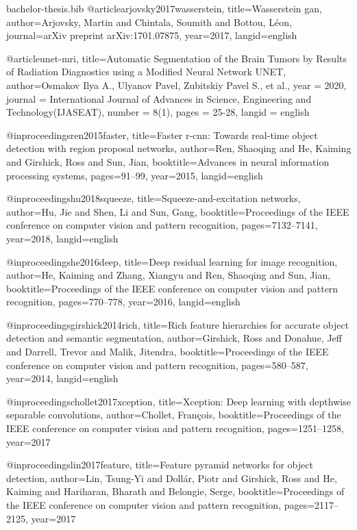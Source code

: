 \begin{filecontents}{bachelor-thesis.bib}
@article{arjovsky2017wasserstein,
  title={Wasserstein gan},
  author={Arjovsky, Martin and Chintala, Soumith and Bottou, L{\'e}on},
  journal={arXiv preprint arXiv:1701.07875},
  year={2017},
  langid={english}
}

@article{unet-mri,
  title={Automatic Segmentation of the Brain Tumors by Results of Radiation Diagnostics using a Modified Neural Network UNET},
  author={Osmakov Ilya A., Ulyanov Pavel, Zubitskiy Pavel S., et al.},
  year      = {2020},
  journal   = {International Journal of Advances in Science, Engineering and Technology(IJASEAT)},
  number    = {8(1)},
  pages     = {25-28},
  langid    = {english}
}



@inproceedings{ren2015faster,
  title={Faster r-cnn: Towards real-time object detection with region proposal networks},
  author={Ren, Shaoqing and He, Kaiming and Girshick, Ross and Sun, Jian},
  booktitle={Advances in neural information processing systems},
  pages={91--99},
  year={2015},
  langid={english}
}

@inproceedings{hu2018squeeze,
  title={Squeeze-and-excitation networks},
  author={Hu, Jie and Shen, Li and Sun, Gang},
  booktitle={Proceedings of the IEEE conference on computer vision and pattern recognition},
  pages={7132--7141},
  year={2018},
  langid={english}
}

@inproceedings{he2016deep,
  title={Deep residual learning for image recognition},
  author={He, Kaiming and Zhang, Xiangyu and Ren, Shaoqing and Sun, Jian},
  booktitle={Proceedings of the IEEE conference on computer vision and pattern recognition},
  pages={770--778},
  year={2016},
  langid={english}
}

@inproceedings{girshick2014rich,
  title={Rich feature hierarchies for accurate object detection and semantic segmentation},
  author={Girshick, Ross and Donahue, Jeff and Darrell, Trevor and Malik, Jitendra},
  booktitle={Proceedings of the IEEE conference on computer vision and pattern recognition},
  pages={580--587},
  year={2014},
  langid={english}
}

@inproceedings{chollet2017xception,
  title={Xception: Deep learning with depthwise separable convolutions},
  author={Chollet, Fran{\c{c}}ois},
  booktitle={Proceedings of the IEEE conference on computer vision and pattern recognition},
  pages={1251--1258},
  year={2017}
}

@inproceedings{lin2017feature,
  title={Feature pyramid networks for object detection},
  author={Lin, Tsung-Yi and Doll{\'a}r, Piotr and Girshick, Ross and He, Kaiming and Hariharan, Bharath and Belongie, Serge},
  booktitle={Proceedings of the IEEE conference on computer vision and pattern recognition},
  pages={2117--2125},
  year={2017}
}

\end{filecontents}


